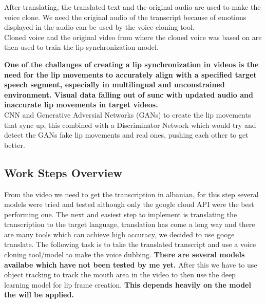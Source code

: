 \documentclass[12pt]{article}
\begin{document}
After translating, the translated text and the original audio are used to make the voice clone. We need the original audio of the transcript because of emotions displayed in the audio can be used by the voice cloning tool.\\
Cloned voice and the original video from where the cloned voice was based on are then used to train the lip synchronization model. 

\textbf{One of the challanges of creating a lip synchronization in videos is the need for the lip movements to accurately align with a specified target speech segment, especially in multilingual and unconstrained environment. Visual data falling out of sunc with updated audio and inaccurate lip movements in target videos.}\\
CNN and Generative Adversial Networks (GANs) to create the lip movements that sync up, this combined with a Discriminator Network which would try and detect the GANs fake lip movements and real ones, pushing each other to get better.

\subsection{Work Steps Overview}

From the video we need to get the transcription in albanian, for this step several models were tried and tested although only the google cloud API were the best performing one. The next and easiest step to implement is translating the transcription to the target language, translation has come a long way and there are many tools which can achieve high accuracy, we decided to use googe translate. The following task is to take the translated transcript and use a voice cloning tool/model to make the voice dubbing. \textbf{There are several models availabe which have not been tested by me yet.} After this we have to use object tracking to track the mouth area in the video to then use the deep learning model for lip frame creation. \textbf{This depends heavily on the model the will be applied.}
\end{document}
